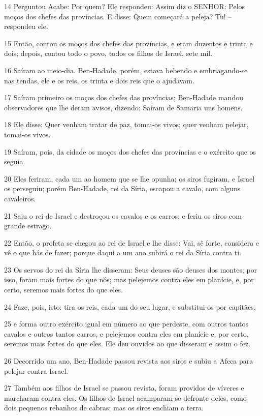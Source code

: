 \par 14 Perguntou Acabe: Por quem? Ele respondeu: Assim diz o SENHOR: Pelos moços dos chefes das províncias. E disse: Quem começará a peleja? Tu! -- respondeu ele.
\par 15 Então, contou os moços dos chefes das províncias, e eram duzentos e trinta e dois; depois, contou todo o povo, todos os filhos de Israel, sete mil.
\par 16 Saíram ao meio-dia. Ben-Hadade, porém, estava bebendo e embriagando-se nas tendas, ele e os reis, os trinta e dois reis que o ajudavam.
\par 17 Saíram primeiro os moços dos chefes das províncias; Ben-Hadade mandou observadores que lhe deram avisos, dizendo: Saíram de Samaria uns homens.
\par 18 Ele disse: Quer venham tratar de paz, tomai-os vivos; quer venham pelejar, tomai-os vivos.
\par 19 Saíram, pois, da cidade os moços dos chefes das províncias e o exército que os seguia.
\par 20 Eles feriram, cada um ao homem que se lhe opunha; os siros fugiram, e Israel os perseguiu; porém Ben-Hadade, rei da Síria, escapou a cavalo, com alguns cavaleiros.
\par 21 Saiu o rei de Israel e destroçou os cavalos e os carros; e feriu os siros com grande estrago.
\par 22 Então, o profeta se chegou ao rei de Israel e lhe disse: Vai, sê forte, considera e vê o que hás de fazer; porque daqui a um ano subirá o rei da Síria contra ti.
\par 23 Os servos do rei da Síria lhe disseram: Seus deuses são deuses dos montes; por isso, foram mais fortes do que nós; mas pelejemos contra eles em planície, e, por certo, seremos mais fortes do que eles.
\par 24 Faze, pois, isto: tira os reis, cada um do seu lugar, e substitui-os por capitães,
\par 25 e forma outro exército igual em número ao que perdeste, com outros tantos cavalos e outros tantos carros, e pelejemos contra eles em planície e, por certo, seremos mais fortes do que eles. Ele deu ouvidos ao que disseram e assim o fez.
\par 26 Decorrido um ano, Ben-Hadade passou revista aos siros e subiu a Afeca para pelejar contra Israel.
\par 27 Também aos filhos de Israel se passou revista, foram providos de víveres e marcharam contra eles. Os filhos de Israel acamparam-se defronte deles, como dois pequenos rebanhos de cabras; mas os siros enchiam a terra.
